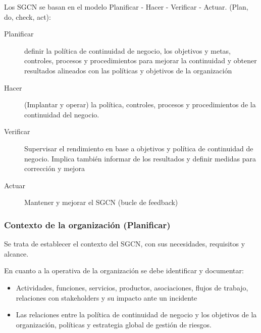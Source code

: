     Los SGCN se basan en el modelo Planificar - Hacer - Verificar - Actuar. (Plan, do, check, act):
    \begin{description}
        \item[Planificar] definir la política de continuidad de negocio, los objetivos y metas, controles, procesos y procedimientos para mejorar la continuidad y obtener resultados alineados con las políticas y objetivos de la organización
        \item[Hacer] (Implantar y operar) la política, controles, procesos y procedimientos de la continuidad del negocio.
        \item[Verificar]Supervisar el rendimiento en base a objetivos y política de continuidad de negocio. Implica también informar de los resultados y definir medidas para corrección y mejora
        \item[Actuar] Mantener y mejorar el SGCN (bucle de feedback)
    \end{description}


    \subsubsection{Contexto de la organización (Planificar)} %
        Se trata de establecer el contexto del SGCN, con sus necesidades, requisitos y alcance.

        En cuanto a la operativa de la organización se debe identificar y documentar:
        \begin{itemize}
            \item Actividades, funciones, servicios, productos, asociaciones, flujos de trabajo, relaciones con stakeholders y su impacto ante un incidente
            \item Las relaciones entre la política de continuidad de negocio y los objetivos de la organización, políticas y estrategia global de gestión de riesgos.
        \end{itemize}

